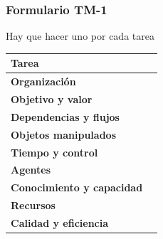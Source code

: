 \documentclass[a4paper,11pt]{article}
\begin{document}
			\subsubsection{Formulario TM-1}
			Hay que hacer uno por cada tarea
			\begin{center}
				\begin{tabular}{| l | l |}
					\hline
					\textbf{Tarea} & \\
					\hline
					\textbf{Organización} & \\
					\hline
					\textbf{Objetivo y valor} & \\
					\hline
					\textbf{Dependencias y flujos} & \\
					\hline
					\textbf{Objetos manipulados} & \\
					\hline
					\textbf{Tiempo y control} & \\
					\hline
					\textbf{Agentes} & \\
					\hline
					\textbf{Conocimiento y capacidad} & \\
					\hline
					\textbf{Recursos} & \\
					\hline
					\textbf{Calidad y eficiencia} & \\
					\hline
				\end{tabular}
			\end{center}
\end{document}
